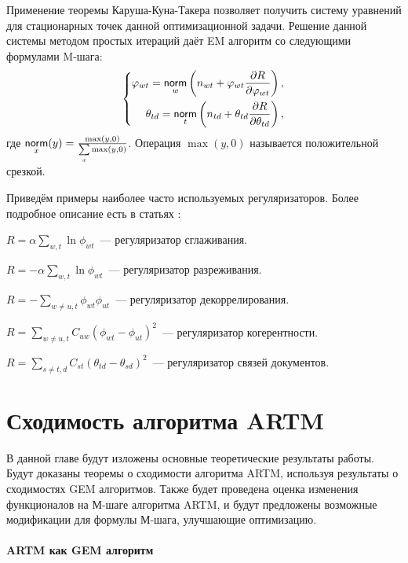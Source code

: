 \documentclass[12pt, twoside]{article}
\begin{document}
Применение теоремы Каруша-Куна-Такера позволяет получить систему уравнений для стационарных точек данной оптимизационной задачи. Решение данной системы методом простых итераций даёт EM алгоритм со следующими формулами M-шага:
\[
\left\{
	\begin{aligned}
\varphi_{wt} = \mathop{\mathsf{norm}}\limits_w  \left(n_{wt} + \varphi_{wt}\frac{\partial R}{\partial\varphi_{wt}}\right),\\
\theta_{td} = \mathop{\mathsf{norm}}\limits_t  \left(n_{td} + \theta_{td}\frac{\partial R}{\partial\theta_{td}}\right),
	\end{aligned}
\right.
\]
где $\norm_x(y) = \frac{\max(y, 0)}{\sum\limits_x \max(y, 0)}$. Операция $\max(y, 0)$ называется положительной срезкой.

Приведём примеры наиболее часто используемых регуляризаторов. Более подробное описание есть в статьях \cite{vorontsov2014additive, vorontsov2014tutorial, vorontsov2015additive}:
\begin{enumerate*}
\item $R = \alpha \sum\limits_{w, t} \ln \phi_{wt}$~--- регуляризатор сглаживания.
\item $R = -\alpha \sum\limits_{w, t} \ln \phi_{wt}$~--- регуляризатор разреживания.
\item $R = -\sum\limits_{w \neq u, t} \phi_{wt} \phi_{ut}$~--- регуляризатор декоррелирования.
\item $R = \sum\limits_{w \neq u, t} C_{uw}\left( \phi_{wt}  - \phi_{ut} \right)^2$~--- регуляризатор когерентности.
\item $R = \sum\limits_{s \neq t, d} C_{st}\left( \theta_{td}  - \theta_{sd} \right)^2$~--- регуляризатор связей документов.
\end{enumerate*}

\section{Сходимость алгоритма ARTM}

В данной главе будут изложены основные теоретические результаты работы. Будут доказаны теоремы о сходимости алгоритма ARTM, используя результаты о сходимостях GEM алгоритмов. Также будет проведена оценка изменения функционалов на М-шаге алгоритма ARTM, и будут предложены возможные модификации для формулы М-шага, улучшающие оптимизацию. 
	
\paragraph{ARTM как GEM алгоритм}
\label{subsec:artmasgem}
\end{document}
